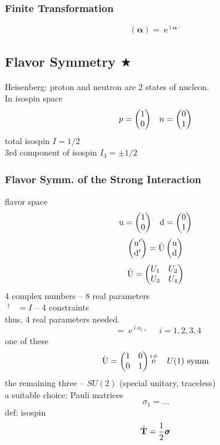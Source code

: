 \documentclass[a4paper]{article}
\DeclareMathOperator{\e}{\mathrm{e}}
\DeclareMathOperator{\I}{\mathrm{i}}
\DeclareMathOperator{\hT}{\hat{\vb{T}}}
\DeclareMathOperator{\hU}{\hat{U}}
\DeclareMathOperator{\hG}{\hat{G}}
\renewcommand{\u}{\mathrm{u}}
\renewcommand{\d}{\mathrm{d}}
\numberwithin{equation}{section}
\begin{document}
\subsubsection{Finite Transformation}
\begin{equation}\label{key}
\hU(\bm\alpha) = \e^{\I\bm\alpha\cdot\hG}
\end{equation}

\subsection{Flavor Symmetry $ \bigstar $}
Heisenberg: proton and neutron are 2 states of nucleon.\\
In isospin space
\begin{equation}\label{key}
p = \mqty(1\\0) \quad n = \mqty(0\\1)
\end{equation}
total isospin $ I = 1/2 $\\
3rd component of isospin $ I_3 = \pm 1/2 $\\

\subsubsection{Flavor Symm. of the Strong Interaction}
flavor space
\begin{equation}\label{key}
\u = \mqty(1\\0) \quad \d = \mqty(0\\1)
\end{equation}
\begin{equation}\label{key}
\mqty(\u'\\ \d') = \hU\mqty(\u\\ \d)
\end{equation}
\begin{equation}\label{key}
\hU = \mqty(U_1 & U_2\\U_3 & U_4)
\end{equation}
4 complex numbers -- 8 real parameters\\
$ \hU^\dagger \hU = I $ -- 4 constraints\\
thus, 4 real parameters needed.
\begin{equation}\label{key}
\hU = \e^{\I\alpha_i\hG_i} \quad i = 1,2,3,4
\end{equation}
one of these
\begin{equation}\label{key}
\hU = \mqty(1 & 0\\0 & 1)\e^{\I\phi}  \quad U(1) \text{ symm}
\end{equation}
the remaining three -- $ SU(2) $ (special unitary, traceless)\\
a suitable choice: Pauli matrices
\begin{equation}\label{key}
\sigma_1 = ...
\end{equation}
def: isospin
\begin{equation}\label{key}
\hT = \dfrac{1}{2}\bm\sigma
\end{equation}
\end{document}
